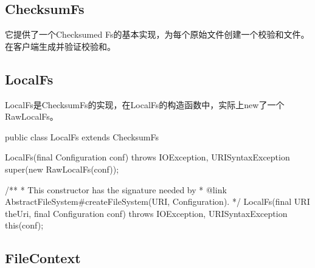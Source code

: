 \subsection{ChecksumFs}
它提供了一个Checksumed Fs的基本实现，为每个原始文件创建一个校验和文件。在客户端生成并验证校验和。


\subsection{LocalFs}
LocalFs是ChecksumFs的实现，在LocalFs的构造函数中，实际上new了一个RawLocalFs。

\begin{java}
public class LocalFs extends ChecksumFs {
  LocalFs(final Configuration conf) throws IOException, URISyntaxException {
    super(new RawLocalFs(conf));
  }

  /**
   * This constructor has the signature needed by
   * {@link AbstractFileSystem#createFileSystem(URI, Configuration)}.
   */
  LocalFs(final URI theUri, final Configuration conf) throws IOException,
      URISyntaxException {
    this(conf);
  }
}
\end{java}



\subsection{FileContext}
